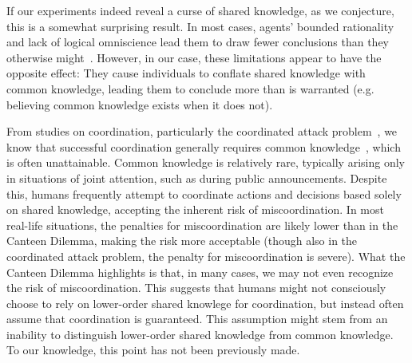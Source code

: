 

If our experiments indeed %
reveal a curse of shared knowledge, as we conjecture, this is a somewhat surprising result. In most cases, agents' bounded rationality and lack of logical omniscience lead them to %
draw fewer conclusions 
than they %
otherwise %
might~\cite{fagin1995reasoning, halpern2011dealing}.
However, in our case, %
these limitations appear to have the opposite effect: They cause individuals to
conflate shared knowledge with common knowledge, %
leading them 
to conclude more than is warranted (e.g. believing %
common knowledge exists when %
it does not). 

From studies on coordination, particularly the coordinated attack problem~\cite{fagin1995reasoning}, we know that successful coordination generally requires common knowledge~\cite{moses2016relating}, %
which is often unattainable.
Common knowledge is relatively rare, %
typically arising only %
in situations of joint %
attention, such as during public announcements. %
Despite this, humans frequently attempt to coordinate actions and %
decisions based solely on
shared knowledge, %
accepting the inherent risk of miscoordination. In most real-life situations, the penalties for miscoordination %
are likely lower than in the Canteen Dilemma, %
making the risk more acceptable (though also in the coordinated attack problem, the penalty for miscoordination is severe). %
What the Canteen Dilemma highlights is that, in many cases, we may not even recognize the risk of miscoordination.
This suggests that humans might not consciously choose to 
rely on lower-order shared knowlege for coordination, but %
instead often
assume that coordination %
is
guaranteed. %
This assumption might stem from an inability
to distinguish lower-order shared knowledge from common knowledge. 
To our knowledge, this point has not been %
previously made. %

